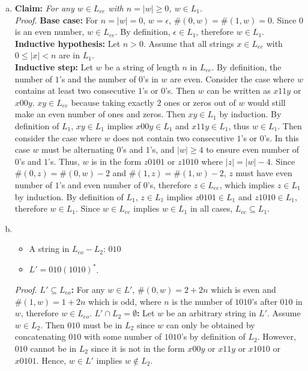 \documentclass[11pt]{article}
\begin{document}
\begin{solution}
\begin{enumerate}[(a)]
\item
\textbf{Claim: }\emph{For any $w\in L_{ee}$ with $n = \lvert w \rvert \geq 0$, $w\in L_{1}$}.\\
\emph{Proof.} \textbf{Base case: } For $n = \lvert w \rvert = 0$, $w=\epsilon$, $\#(0,w)=\#(1,w)=0$. Since $0$ is an even number, $w\in L_{ee}$. By definition, $\epsilon \in L_{1}$, therefore $w \in L_{1}$.\\
\textbf{Inductive hypothesis: } Let $n > 0$. Assume that all strings $x\in L_{ee}$ with $0 \leq \lvert x \rvert < n$ are in $L_{1}$.\\
\textbf{Inductive step: } Let $w$ be a string of length $n$ in $L_{ee}$. By definition, the number of $1$'s and the number of $0$'s in $w$ are even. Consider the case where $w$ contains at least two consecutive $1$'s or $0$'s. Then $w$ can be written as $x11y$ or $x00y$. $xy\in L_{ee}$ because taking exactly $2$ ones or zeros out of $w$ would still make an even number of ones and zeros. Then $xy\in L_{1}$ by induction. By definition of $L_{1}$, $xy\in L_{1}$ implies $x00y\in L_{1}$ and $x11y\in L_{1}$, thus $w\in L_{1}$. Then consider the case where $w$ does not contain two consecutive $1$'s or $0$'s. In this case $w$ must be alternating $0$'s and $1$'s, and $\lvert w \rvert \geq 4$ to ensure even number of $0$'s and $1$'s. Thus, $w$ is in the form $z0101$ or $z1010$ where $\lvert z \rvert = \lvert w \rvert - 4$. Since $\#(0, z)=\#(0, w)-2$ and $\#(1, z)=\#(1, w)-2$, $z$ must have even number of $1$'s and even number of $0$'s, therefore $z\in L_{ee}$, which implies $z\in L_{1}$ by induction. By definition of $L_{1}$, $z\in L_{1}$ implies $z0101\in L_{1}$ and $z1010\in L_{1}$, therefore $w\in L_{1}$. Since $w\in L_{ee}$ implies $w\in L_{1}$ in all cases, $L_{ee}\subseteq L_{1}$.

\item
\begin{itemize}
\item A string in $L_{eo} - L_{2}$: $010$
\item $L'=010(1010)^{*}$.
\end{itemize}
\emph{Proof.} \textbf{$L'\subseteq L_{eo}$: }For any $w\in L'$, $\#(0, w)=2+2n$ which is even and $\#(1, w)=1+2n$ which is odd, where $n$ is the number of $1010$'s after $010$ in $w$, therefore $w\in L_{eo}$. \textbf{$L'\cap L_{2}=\emptyset$: }Let $w$ be an arbitrary string in $L'$. Assume $w\in L_{2}$. Then $010$ must be in $L_{2}$ since $w$ can only be obtained by concatenating $010$ with some number of $1010$'s by definition of $L_{2}$. However, $010$ cannot be in $L_{2}$ since it is not in the form $x00y$ or $x11y$ or $x1010$ or $x0101$. Hence, $w\in L'$ implies $w\notin L_{2}$.
\end{enumerate}
\end{solution}
\end{document}
